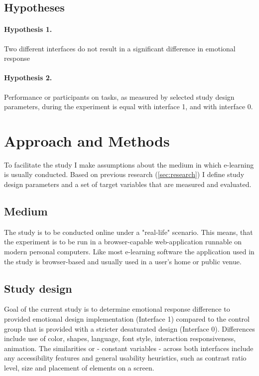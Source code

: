 	\subsection{Hypotheses}
	
		\paragraph{Hypothesis 1.} Two different interfaces do not result in a significant difference in emotional response
		\paragraph{Hypothesis 2.} Performance or participants on tasks, as measured by selected study design parameters, during the experiment is equal with interface 1, and with interface 0.

\section{Approach and Methods}

To facilitate the study I make assumptions about the medium in which e-learning is usually conducted. Based on previous research (\ref{sec:research}) I define study design parameters and a set of target variables that are measured and evaluated.

	\subsection{Medium}
	
	The study is to be conducted online under a "real-life" scenario. This means, that the experiment is to be run in a browser-capable web-application runnable on modern personal computers. Like most e-learning software the  application used in the study is browser-based and usually used in a user's home or public venue.
	
	\subsection{Study design} \label{sec:study-design}
	
	Goal of the current study is to determine emotional response difference to provided emotional design implementation (Interface 1) compared to the control group that is provided with a stricter desaturated design (Interface 0). Differences include use of color, shapes, language, font style, interaction responsiveness, animation. The similarities or - constant variables - across both interfaces include any accessibility features and general usability heuristics, such as contrast ratio level, size and placement of elements on a screen.
	
